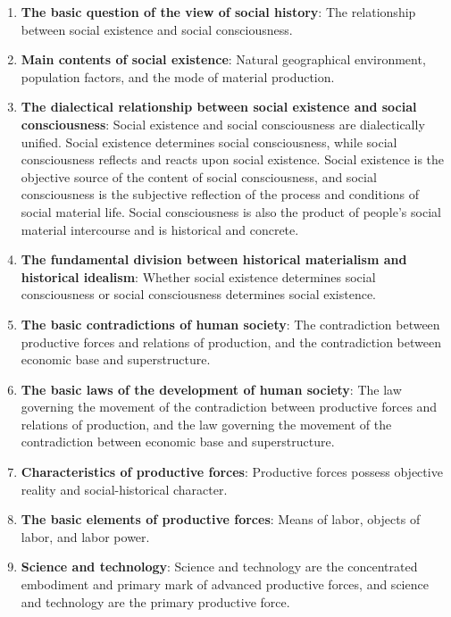 \documentclass[12pt,a4paper]{ctexart}
\begin{document}
\begin{enumerate}[leftmargin=2em]
    \item \textbf{The basic question of the view of social history}: The relationship between social existence and social consciousness.
    
    \item \textbf{Main contents of social existence}: Natural geographical environment, population factors, and the mode of material production.
    
    \item \textbf{The dialectical relationship between social existence and social consciousness}: Social existence and social consciousness are dialectically unified. Social existence determines social consciousness, while social consciousness reflects and reacts upon social existence. Social existence is the objective source of the content of social consciousness, and social consciousness is the subjective reflection of the process and conditions of social material life. Social consciousness is also the product of people's social material intercourse and is historical and concrete.
    
    \item \textbf{The fundamental division between historical materialism and historical idealism}: Whether social existence determines social consciousness or social consciousness determines social existence.
    
    \item \textbf{The basic contradictions of human society}: The contradiction between productive forces and relations of production, and the contradiction between economic base and superstructure.
    
    \item \textbf{The basic laws of the development of human society}: The law governing the movement of the contradiction between productive forces and relations of production, and the law governing the movement of the contradiction between economic base and superstructure.
    
    \item \textbf{Characteristics of productive forces}: Productive forces possess objective reality and social-historical character.
    
    \item \textbf{The basic elements of productive forces}: Means of labor, objects of labor, and labor power.
    
    \item \textbf{Science and technology}: Science and technology are the concentrated embodiment and primary mark of advanced productive forces, and science and technology are the primary productive force.
    

\end{enumerate}
\end{document}
